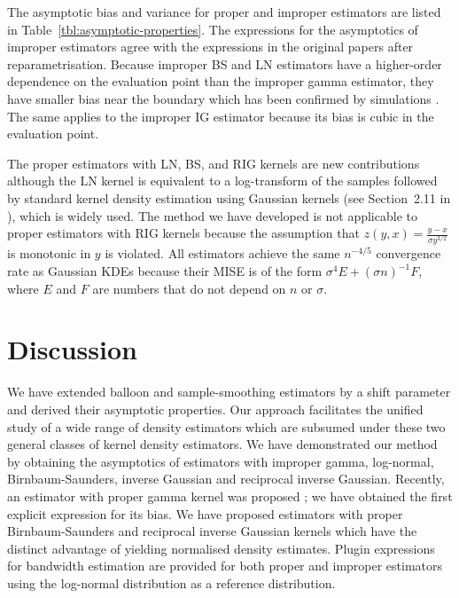 The asymptotic bias and variance for proper and improper estimators are listed in Table~\ref{tbl:asymptotic-properties}. The expressions for the asymptotics of improper estimators agree with the expressions in the original papers after reparametrisation. Because improper BS and LN estimators have a higher-order dependence on the evaluation point than the improper gamma estimator, they have smaller bias near the boundary which has been confirmed by simulations \cite{Jin2003}. The same applies to the improper IG estimator because its bias is cubic in the evaluation point.

The proper estimators with LN, BS, and RIG kernels are new contributions although the LN kernel is equivalent to a log-transform of the samples followed by standard kernel density estimation using Gaussian kernels (see Section~2.11 in \cite{Silverman1986}), which is widely used. The method we have developed is not applicable to proper estimators with RIG kernels because the assumption that $z\left(y,x\right)=\frac{y-x}{\sigma y^{3/2}}$ is monotonic in $y$ is violated.  All estimators achieve the same $n^{-4/5}$ convergence rate as Gaussian KDEs because their MISE is of the form $\sigma^{4}E+\left(\sigma n\right)^{-1}F$, where $E$ and $F$ are numbers that do not depend on $n$ or $\sigma$.


\section{Discussion\label{sec:discussion}}

We have extended balloon and sample-smoothing estimators by a shift parameter and derived their asymptotic properties. Our approach facilitates the unified study of a wide range of density estimators which are subsumed under these two general classes of kernel density estimators. We have demonstrated our method by obtaining the asymptotics of estimators with improper gamma, log-normal, Birnbaum-Saunders, inverse Gaussian and reciprocal inverse Gaussian. Recently, an estimator with proper gamma kernel was proposed \cite{Jeon2014}; we have obtained the first explicit expression for its bias. We have proposed estimators with proper Birnbaum-Saunders and reciprocal inverse Gaussian kernels which have the distinct advantage of yielding normalised density estimates. Plugin expressions for bandwidth estimation are provided for both proper and improper estimators using the log-normal distribution as a reference distribution.

